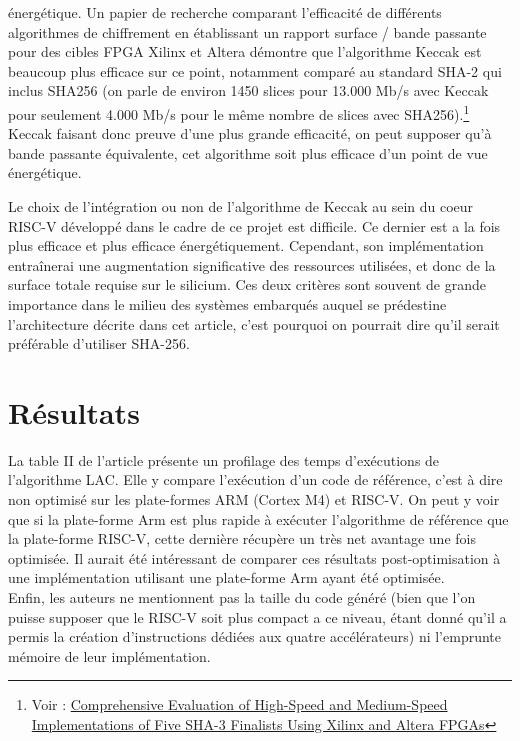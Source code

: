 \documentclass[10pt,a4paper]{article}
\begin{document}
\begin{itemize}
 énergétique. Un papier de recherche comparant l'efficacité de différents algorithmes de chiffrement en établissant un rapport surface / bande passante pour des cibles FPGA Xilinx et 
 Altera démontre que l'algorithme Keccak est beaucoup plus efficace sur ce point, notamment comparé au standard SHA-2 qui inclus SHA256 (on parle de environ 1450 slices pour 13.000 Mb/s avec Keccak pour seulement 
 4.000 Mb/s pour le même nombre de slices avec SHA256).\footnote{Voir : \href{https://eprint.iacr.org/2012/368}{Comprehensive Evaluation of High-Speed and Medium-Speed Implementations of Five SHA-3 Finalists Using Xilinx and Altera FPGAs}}\\
 Keccak faisant donc preuve d'une plus grande efficacité, on peut supposer qu'à bande passante équivalente, cet algorithme soit plus efficace d'un point de vue énergétique.
\end{itemize}

Le choix de l'intégration ou non de l'algorithme de Keccak au sein du coeur RISC-V développé dans le cadre de ce projet est difficile. Ce dernier est a la fois plus efficace 
et plus efficace énergétiquement. Cependant, son implémentation entraînerai une augmentation significative des ressources utilisées, et donc de la surface totale requise sur le 
silicium. Ces deux critères sont souvent de grande importance dans le milieu des systèmes embarqués auquel se prédestine l'architecture décrite dans cet article, c'est 
pourquoi on pourrait dire qu'il serait préférable d'utiliser SHA-256.\\
 

\section{Résultats}
La table II de l'article présente un profilage des temps d'exécutions de l'algorithme LAC. Elle y compare l'exécution d'un code de référence, c'est à dire non optimisé sur les plate-formes
 ARM (Cortex M4) et RISC-V. On peut y voir que si la plate-forme Arm est plus rapide à exécuter l'algorithme de référence que la plate-forme RISC-V, cette dernière récupère un très net avantage 
une fois optimisée. Il aurait été intéressant de comparer ces résultats post-optimisation à une implémentation utilisant une plate-forme Arm ayant été optimisée.\\
Enfin, les auteurs ne mentionnent pas la taille du code généré (bien que l'on puisse supposer que le RISC-V soit plus compact a ce niveau, étant donné qu'il a permis la création d'instructions 
dédiées aux quatre accélérateurs) ni l'emprunte mémoire de leur implémentation.
\end{document}
